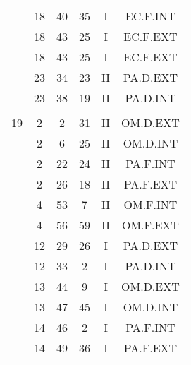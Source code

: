 \documentclass[12pt, a4paper]{article}
\begin{document}
\begin{multicols}{3}
{\begin{tabular}{c c c c c c}
	 	 	 	 & 18 & 40 & 35 & I & EC.F.INT\\%
	 	 	 	 & 18 & 43 & 25 & I & EC.F.EXT\\%
	 	 	 	 & 18 & 43 & 25 & I & EC.F.EXT\\%
	 	 	 	 & 23 & 34 & 23 & II & PA.D.EXT\\%
	 	 	 	 & 23 & 38 & 19 & II & PA.D.INT\\%
	 	 	 	 & & & & & \\%
	 	 	 	19 & 2 & 2 & 31 & II & OM.D.EXT\\%
	 	 	 	 & 2 & 6 & 25 & II & OM.D.INT\\%
	 	 	 	 & 2 & 22 & 24 & II & PA.F.INT\\%
	 	 	 	 & 2 & 26 & 18 & II & PA.F.EXT\\%
	 	 	 	 & 4 & 53 & 7 & II & OM.F.INT\\%
	 	 	 	 & 4 & 56 & 59 & II & OM.F.EXT\\%
	 	 	 	 & 12 & 29 & 26 & I & PA.D.EXT\\%
	 	 	 	 & 12 & 33 & 2 & I & PA.D.INT\\%
	 	 	 	 & 13 & 44 & 9 & I & OM.D.EXT\\%
	 	 	 	 & 13 & 47 & 45 & I & OM.D.INT\\%
	 	 	 	 & 14 & 46 & 2 & I & PA.F.INT\\%
	 	 	 	 & 14 & 49 & 36 & I & PA.F.EXT\\%
	 	 \end{tabular}
 	}
\end{multicols}
\end{document}

